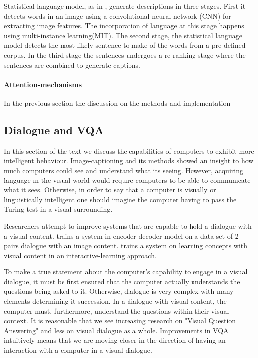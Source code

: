 Statistical language model, as in \cite{fang2015captions}, generate descriptions in three stages. First it detects words in an image using a convolutional neural network (CNN) for extracting image features. The incorporation of language at this stage happens using multi-instance learning(MIT)\cite{zhang2005multiple}. The second stage, the statistical language model detects the most likely sentence to make of the words from a pre-defined corpus. In the third stage the sentences undergoes a re-ranking stage where the sentences are combined to generate captions. 


\paragraph{Attention-mechanisms}


In the previous section the discussion on the methods and implementation 

\subsection{Dialogue and VQA}

In this section of the text we discuss the capabilities of computers to exhibit more intelligent behaviour. Image-captioning and its methods showed an insight to how much computers could see and understand what its seeing. However, acquiring language in the visual world would require computers to be able to communicate what it sees. Otherwise, in order to say that a computer is visually or linguistically intelligent one should imagine the computer having to pass the Turing test in a visual surrounding. 

Researchers attempt to improve systems that are capable to hold a dialogue with a visual content.\cite{das2017visual} trains a system in  encoder-decoder model on a data set of 2 pairs dialogue with an image content.\cite{Skoaj2011ASF} trains a system on learning concepts with visual content in an interactive-learning approach. 

To make a true statement about the computer's capability to engage in a visual dialogue, it must be first ensured that the computer actually understands the questions being asked to it. Otherwise, dialogue is very complex with many elements determining it succession. In a dialogue with visual content, the computer must, furthermore, understand the questions within their visual context. It is reasonable that we see increasing research on "Visual Question Answering" and less on visual dialogue as a whole. Improvements in VQA intuitively means that we are moving closer in the direction of having an interaction with a computer in a visual dialogue.  


